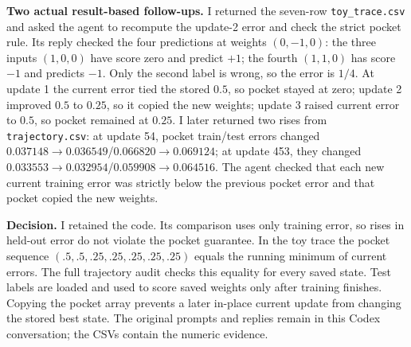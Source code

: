 \documentclass[11pt,a4paper]{article}
\begin{document}
\noindent\textbf{Two actual result-based follow-ups.} I returned the seven-row \texttt{toy\_trace.csv} and asked the agent to recompute the update-2 error and check the strict pocket rule. Its reply checked the four predictions at weights $(0,-1,0)$: the three inputs $(1,0,0)$ have score zero and predict $+1$; the fourth $(1,1,0)$ has score $-1$ and predicts $-1$. Only the second label is wrong, so the error is $1/4$. At update 1 the current error tied the stored $0.5$, so pocket stayed at zero; update 2 improved $0.5$ to $0.25$, so it copied the new weights; update 3 raised current error to $0.5$, so pocket remained at $0.25$. I later returned two rises from \texttt{trajectory.csv}: at update 54, pocket train/test errors changed $0.037148\to0.036549$/$0.066820\to0.069124$; at update 453, they changed $0.033553\to0.032954$/$0.059908\to0.064516$. The agent checked that each new current training error was strictly below the previous pocket error and that pocket copied the new weights.

\noindent\textbf{Decision.} I retained the code. Its comparison uses only training error, so rises in held-out error do not violate the pocket guarantee. In the toy trace the pocket sequence $(.5,.5,.25,.25,.25,.25,.25)$ equals the running minimum of current errors. The full trajectory audit checks this equality for every saved state. Test labels are loaded and used to score saved weights only after training finishes. Copying the pocket array prevents a later in-place current update from changing the stored best state. The original prompts and replies remain in this Codex conversation; the CSVs contain the numeric evidence.
\end{document}

